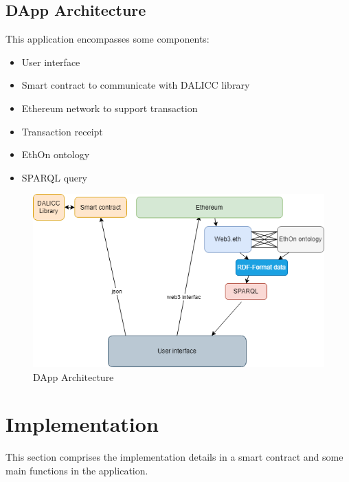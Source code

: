 \subsection{DApp Architecture} 
This application encompasses some components:
\begin{itemize}
	\item User interface
	\item Smart contract to communicate with DALICC library
	\item Ethereum network to support transaction
	\item Transaction receipt
	\item EthOn ontology
	\item SPARQL query    
\end{itemize} 
\begin{center}
   \begin{figure}[htb!]
		
		\begin{minipage}{0.75\linewidth}
			
			\includegraphics[width=1.5\textwidth]{images/chap03_eth_dalicc_comm.png}
		\end{minipage}
		\caption{DApp Architecture}
	\end{figure}
\end{center}

\section{Implementation}
This section comprises the implementation details in a smart contract and some main functions in the application.

